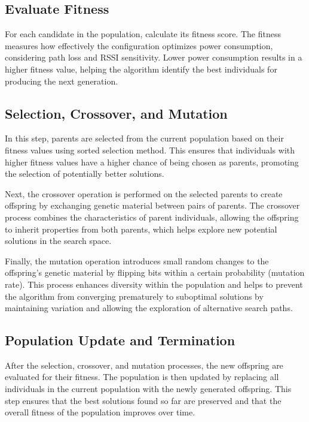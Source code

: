 \subsection{Evaluate Fitness}

For each candidate in the population, calculate its fitness score. The fitness measures how effectively the configuration optimizes power consumption, considering path loss and \gls{RSSI} sensitivity. Lower power consumption results in a higher fitness value, helping the algorithm identify the best individuals for producing the next generation.

\subsection{Selection, Crossover, and Mutation}

In this step, parents are selected from the current population based on their fitness values using sorted selection method. This ensures that individuals with higher fitness values have a higher chance of being chosen as parents, promoting the selection of potentially better solutions.

Next, the crossover operation is performed on the selected parents to create offspring by exchanging genetic material between pairs of parents. The crossover process combines the characteristics of parent individuals, allowing the offspring to inherit properties from both parents, which helps explore new potential solutions in the search space.

Finally, the mutation operation introduces small random changes to the offspring's genetic material by flipping bits within a certain probability (mutation rate). This process enhances diversity within the population and helps to prevent the algorithm from converging prematurely to suboptimal solutions by maintaining variation and allowing the exploration of alternative search paths.

\subsection{Population Update and Termination}

After the selection, crossover, and mutation processes, the new offspring are evaluated for their fitness. The population is then updated by replacing all individuals in the current population with the newly generated offspring. This step ensures that the best solutions found so far are preserved and that the overall fitness of the population improves over time.

